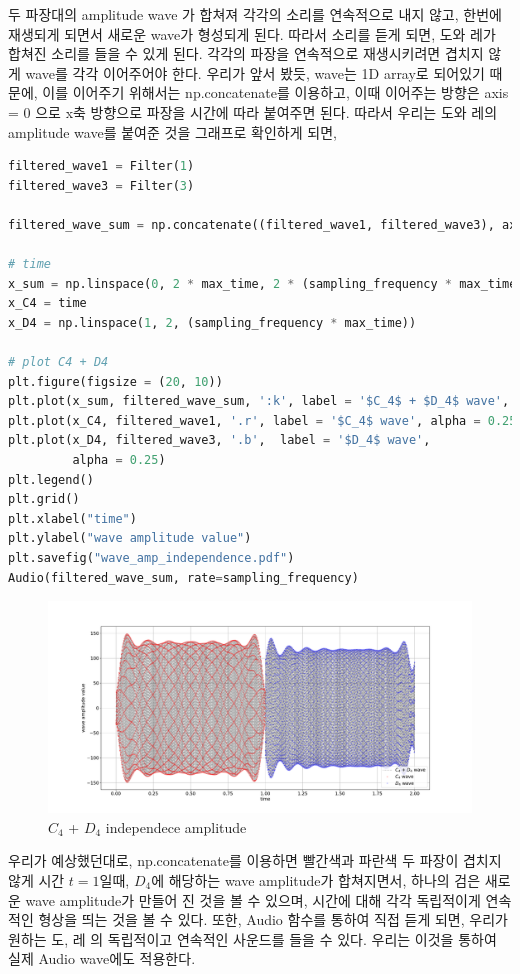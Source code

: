 \documentclass[11pt]{article}
\begin{document}
두 파장대의 amplitude wave 가 합쳐져 각각의 소리를 연속적으로 내지 않고, 한번에 재생되게 되면서 새로운 wave가 형성되게 된다. 따라서 소리를 듣게 되면, 도와 레가 합쳐진 소리를 들을 수 있게 된다. 각각의 파장을 연속적으로 재생시키려면 겹치지 않게 wave를 각각 이어주어야 한다. 우리가 앞서 봤듯, wave는 1D array로 되어있기 때문에, 이를 이어주기 위해서는 np.concatenate를 이용하고, 이때 이어주는 방향은 axis = 0 으로 x축 방향으로 파장을 시간에 따라 붙여주면 된다. 따라서 우리는 도와 레의 amplitude wave를 붙여준 것을 그래프로 확인하게 되면,

\begin{lstlisting}[language=Python]
filtered_wave1 = Filter(1)
filtered_wave3 = Filter(3)

filtered_wave_sum = np.concatenate((filtered_wave1, filtered_wave3), axis = 0)

# time
x_sum = np.linspace(0, 2 * max_time, 2 * (sampling_frequency * max_time + 1) - 1)[:-1]
x_C4 = time
x_D4 = np.linspace(1, 2, (sampling_frequency * max_time))

# plot C4 + D4
plt.figure(figsize = (20, 10))
plt.plot(x_sum, filtered_wave_sum, ':k', label = '$C_4$ + $D_4$ wave', alpha = 0.5) 
plt.plot(x_C4, filtered_wave1, '.r', label = '$C_4$ wave', alpha = 0.25)
plt.plot(x_D4, filtered_wave3, '.b',  label = '$D_4$ wave',
         alpha = 0.25)
plt.legend()
plt.grid()
plt.xlabel("time")
plt.ylabel("wave amplitude value")
plt.savefig("wave_amp_independence.pdf")
Audio(filtered_wave_sum, rate=sampling_frequency)
\end{lstlisting}

\begin{figure}[!ht]
  \centering
  \includegraphics[width=1\textwidth]{wave_amp_independence.pdf}
  \caption{$C_{4}$ + $D_{4}$ independece amplitude}
\end{figure}


우리가 예상했던대로, np.concatenate를 이용하면 빨간색과 파란색 두 파장이 겹치지 않게 시간 $t = 1$일때, $D_4$에 해당하는 wave amplitude가 합쳐지면서, 하나의 검은 새로운 wave amplitude가 만들어 진 것을 볼 수 있으며, 시간에 대해 각각 독립적이게 연속적인 형상을 띄는 것을 볼 수 있다. 또한, Audio 함수를 통하여 직접 듣게 되면, 우리가 원하는 도, 레 의 독립적이고 연속적인 사운드를 들을 수 있다. 우리는 이것을 통하여 실제 Audio wave에도 적용한다.
\end{document}
